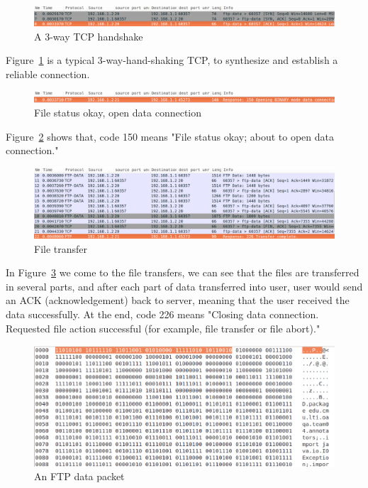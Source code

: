 \begin{figure}[ht!]
\centering
\includegraphics[scale=0.35]{eps/ftp2.eps}
\caption{A 3-way TCP handshake}
\label{ftp2}
\end{figure}

Figure~\ref{ftp2} is a typical 3-way-hand-shaking TCP, to synthesize and
establish a reliable connection.

\begin{figure}[ht!]
\centering
\includegraphics[scale=0.35]{eps/ftp3.eps}
\caption{File status okay, open data connection}
\label{ftp3}
\end{figure}

Figure~\ref{ftp3} shows that, code 150 means "File status okay; about to open
data connection."

\begin{figure}[ht!]
\centering
\includegraphics[scale=0.35]{eps/ftp4.eps}
\caption{File transfer}
\label{ftp4}
\end{figure}

In Figure~\ref{ftp4} 
we come to the file transfers, we can see that the files are
transferred in several parts, and after each part of data transferred
into user, user would send an ACK (acknowledgement) back to server,
meaning that the user received the data successfully. At the end, code
226 means "Closing data connection. Requested file action successful
(for example, file transfer or file abort)."

\begin{figure}[ht!]
\centering
\includegraphics[scale=0.65]{eps/ftp5.eps}
\caption{An FTP data packet}
\label{ftp5}
\end{figure}

